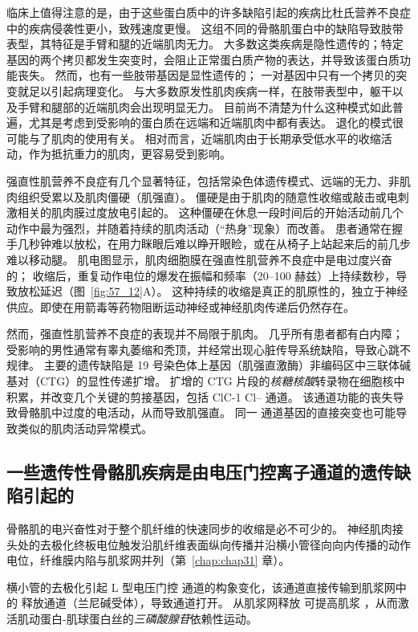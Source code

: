 临床上值得注意的是，由于这些蛋白质中的许多缺陷引起的疾病比杜氏营养不良症中的疾病侵袭性更小，致残速度更慢。
这组不同的骨骼肌蛋白中的缺陷导致肢带表型，其特征是手臂和腿的近端肌肉无力。
大多数这类疾病是隐性遗传的；特定基因的两个拷贝都发生突变时，会阻止正常蛋白质产物的表达，并导致该蛋白质功能丧失。
然而，也有一些肢带基因是显性遗传的；
一对基因中只有一个拷贝的突变就足以引起病理变化。
与大多数原发性肌肉疾病一样，在肢带表型中，躯干以及手臂和腿部的近端肌肉会出现明显无力。
目前尚不清楚为什么这种模式如此普遍，尤其是考虑到受影响的蛋白质在远端和近端肌肉中都有表达。
退化的模式很可能与了肌肉的使用有关。
相对而言，近端肌肉由于长期承受低水平的收缩活动，作为抵抗重力的肌肉，更容易受到影响。


强直性肌营养不良症有几个显著特征，包括常染色体遗传模式、远端的无力、非肌肉组织受累以及肌肉僵硬（肌强直）。
僵硬是由于肌肉的随意性收缩或敲击或电刺激相关的肌肉膜过度放电引起的。
这种僵硬在休息一段时间后的开始活动前几个动作中最为强烈，并随着持续的肌肉活动（“热身”现象）而改善。
患者通常在握手几秒钟难以放松，在用力眯眼后难以睁开眼睑，或在从椅子上站起来后的前几步难以移动腿。
肌电图显示，肌肉细胞膜在强直性肌营养不良症中是电过度兴奋的；
收缩后，重复动作电位的爆发在振幅和频率（20–100 赫兹）上持续数秒，导致放松延迟（图~\ref{fig:57_12}A）。
这种持续的收缩是真正的肌原性的，独立于神经供应。即使在用箭毒等药物阻断运动神经或神经肌肉传递后仍然存在。


然而，强直性肌营养不良症的表现并不局限于肌肉。
几乎所有患者都有白内障；
受影响的男性通常有睾丸萎缩和秃顶，并经常出现心脏传导系统缺陷，导致心跳不规律。
主要的遗传缺陷是 19 号染色体上基因（肌强直激酶）非编码区中三联体碱基对（CTG）的显性传递扩增。
扩增的 CTG 片段的\textit{核糖核酸}转录物在细胞核中积累，并改变几个关键的剪接基因，包括 ClC-1 Cl– 通道。
该通道功能的丧失导致骨骼肌中过度的电活动，从而导致肌强直。
同一  通道基因的直接突变也可能导致类似的肌肉活动异常模式。



\subsection{一些遗传性骨骼肌疾病是由电压门控离子通道的遗传缺陷引起的}

骨骼肌的电兴奋性对于整个肌纤维的快速同步的收缩是必不可少的。
神经肌肉接头处的去极化终板电位触发沿肌纤维表面纵向传播并沿横小管径向向内传播的动作电位，纤维膜内陷与肌浆网并列（第~\ref{chap:chap31} 章）。


横小管的去极化引起 L 型电压门控  通道的构象变化，该通道直接传输到肌浆网中的  释放通道（兰尼碱受体），导致通道打开。
从肌浆网释放  可提高肌浆 ，从而激活肌动蛋白-肌球蛋白丝的\textit{三磷酸腺苷}依赖性运动。


